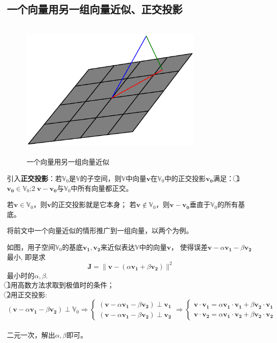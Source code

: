 \documentclass{article}
\begin{document}
\begin{CJK}{UTF8}{gbsn}
\section{一个向量用另一组向量近似、正交投影}
\begin{figure}[H]
\centering
\includegraphics[height=7cm,width=9cm]{./figs/fig2.eps}
\caption{一个向量用另一组向量近似}
\label{2}
\end{figure}
	引入\textbf{正交投影}：若$\mathbb{V}_0$是$\mathbb{V}$的子空间，则$\mathbb{V}$中向量$\boldsymbol{v}$在$\mathbb{V}_0$中的正交投影$\boldsymbol{v_0}$满足：
	\textcircled{1}$\boldsymbol{v_0}\in\mathbb{V}_0$;\textcircled{2}$\boldsymbol{v}-\boldsymbol{v_0}$与$\mathbb{V}_0$中所有向量都正交。\par
	若$\boldsymbol{v}\in\mathbb{V}_0$，则$\boldsymbol{v}$的正交投影就是它本身；
	若$\boldsymbol{v}\notin\mathbb{V}_0$，则$\boldsymbol{v}-\boldsymbol{v_0}$垂直于$\mathbb{V}_0$的所有基底。\par
	将前文中一个向量近似的情形推广到一组向量，以两个为例。\par
	如图，用子空间$\mathbb{V}_0$的基底$\boldsymbol{v_1},\boldsymbol{v_2}$来近似表达$\mathbb{V}$中的向量$\boldsymbol{v}$，
	使得误差$\boldsymbol{v}-\alpha\boldsymbol{v_1}-\beta\boldsymbol{v_2}$最小,
	即是求$$\boldsymbol{J}=\parallel\boldsymbol{v}-(\alpha\boldsymbol{v_1}+\beta\boldsymbol{v_2})\parallel ^2$$最小时的$\alpha,\beta$.\\
	\indent\textcircled{1}用高数方法求取到极值时的条件；\\
    \indent\textcircled{2}用正交投影:
	$$(\boldsymbol{v}-\alpha\boldsymbol{v_1}-\beta\boldsymbol{v_2})\perp\mathbb{V}_0
	\Rightarrow\left\{\begin{aligned}(\boldsymbol{v}-\alpha\boldsymbol{v_1}-\beta\boldsymbol{v_2})\perp\boldsymbol{v_1}\\
	(\boldsymbol{v}-\alpha\boldsymbol{v_1}-\beta\boldsymbol{v_2})\perp\boldsymbol{v_2}\end{aligned}\right.
	\Rightarrow\left\{\begin{aligned}\boldsymbol{v}\cdot\boldsymbol{v_1}=\alpha\boldsymbol{v_1}\cdot\boldsymbol{v_1}+\beta\boldsymbol{v_2}\cdot\boldsymbol{v_1}\\
	\boldsymbol{v}\cdot\boldsymbol{v_2}=\alpha\boldsymbol{v_1}\cdot\boldsymbol{v_2}+\beta\boldsymbol{v_2}\cdot\boldsymbol{v_2}\end{aligned}\right.$$\\
	二元一次，解出$\alpha,\beta$即可。\\



\end{CJK}
\end{document}
